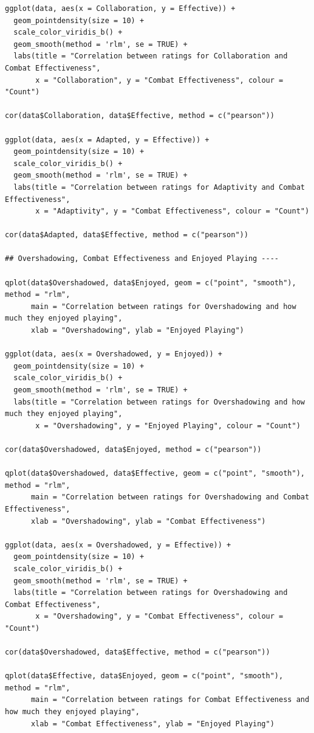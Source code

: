 \documentclass{IEEEtran}
\begin{document}
\begin{verbatim}
ggplot(data, aes(x = Collaboration, y = Effective)) +
  geom_pointdensity(size = 10) +
  scale_color_viridis_b() + 
  geom_smooth(method = 'rlm', se = TRUE) +
  labs(title = "Correlation between ratings for Collaboration and Combat Effectiveness",
       x = "Collaboration", y = "Combat Effectiveness", colour = "Count")

cor(data$Collaboration, data$Effective, method = c("pearson"))

ggplot(data, aes(x = Adapted, y = Effective)) +
  geom_pointdensity(size = 10) +
  scale_color_viridis_b() + 
  geom_smooth(method = 'rlm', se = TRUE) +
  labs(title = "Correlation between ratings for Adaptivity and Combat Effectiveness",
       x = "Adaptivity", y = "Combat Effectiveness", colour = "Count")

cor(data$Adapted, data$Effective, method = c("pearson"))

## Overshadowing, Combat Effectiveness and Enjoyed Playing ----

qplot(data$Overshadowed, data$Enjoyed, geom = c("point", "smooth"), method = "rlm",
      main = "Correlation between ratings for Overshadowing and how much they enjoyed playing", 
      xlab = "Overshadowing", ylab = "Enjoyed Playing")

ggplot(data, aes(x = Overshadowed, y = Enjoyed)) +
  geom_pointdensity(size = 10) +
  scale_color_viridis_b() + 
  geom_smooth(method = 'rlm', se = TRUE) +
  labs(title = "Correlation between ratings for Overshadowing and how much they enjoyed playing",
       x = "Overshadowing", y = "Enjoyed Playing", colour = "Count")

cor(data$Overshadowed, data$Enjoyed, method = c("pearson"))

qplot(data$Overshadowed, data$Effective, geom = c("point", "smooth"), method = "rlm",
      main = "Correlation between ratings for Overshadowing and Combat Effectiveness", 
      xlab = "Overshadowing", ylab = "Combat Effectiveness")

ggplot(data, aes(x = Overshadowed, y = Effective)) +
  geom_pointdensity(size = 10) +
  scale_color_viridis_b() + 
  geom_smooth(method = 'rlm', se = TRUE) +
  labs(title = "Correlation between ratings for Overshadowing and Combat Effectiveness",
       x = "Overshadowing", y = "Combat Effectiveness", colour = "Count")

cor(data$Overshadowed, data$Effective, method = c("pearson"))

qplot(data$Effective, data$Enjoyed, geom = c("point", "smooth"), method = "rlm",
      main = "Correlation between ratings for Combat Effectiveness and how much they enjoyed playing", 
      xlab = "Combat Effectiveness", ylab = "Enjoyed Playing")


\end{verbatim}
\end{document}
